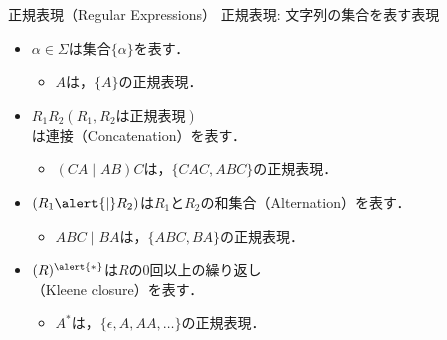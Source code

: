 \documentclass[dvipdfmx,12pt,beamer]{standalone}
\begin{document}
\begin{frame}{正規表現（Regular Expressions）} 
  \alert{正規表現}: 文字列の集合を表す表現\\
	\begin{itemize}
    \item $\alpha \in \Sigma$は集合$\{\alpha\}$を表す．
			\begin{itemize}
        \item $A$は，$\{A\}$の正規表現．
			\end{itemize}
    \item $R_1R_2 \left( R_1, R_2 \text{は正規表現} \right)$\\ は連接（Concatenation）を表す．
			\begin{itemize}
				\item $(CA\mid AB)C$は，$\{CAC, ABC\}$の正規表現．
			\end{itemize}
    \item $(R_1\alert{\mid}R_2)$は$R_1$と$R_2$の和集合（Alternation）を表す．
			\begin{itemize}
				\item $ABC\mid BA$は，$\{ABC, BA\}$の正規表現．
			\end{itemize}
    \item $(R)^{\alert{*}}$は$R$の$0$回以上の繰り返し\\（Kleene closure）を表す．
			\begin{itemize}
				\item $A^*$は，$\{\epsilon, A, AA, \ldots\}$の正規表現．
			\end{itemize}
	\end{itemize}
\end{frame}
\end{document}
